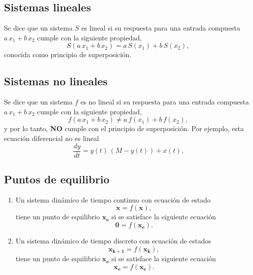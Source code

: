 \subsection{Sistemas lineales}

Se dice que un sistema $S$ es lineal si su respuesta para una entrada
compuesta $a \, x_{1}+b \, x_{2}$ cumple con la siguiente propiedad,
\begin{equation}
  S\left( a \, x_{1}+ b\, x_{2}\right) =a \, S\left( x_{1}\right) +b \, S\left( x_{2}\right),
\end{equation}
conocida como principio de superposici\'{o}n.

\subsection{Sistemas no lineales}

Se dice que un sistema $f$ es no lineal si su respuesta para una
entrada compuesta $a \, x_{1}+b \, x_{2}$ cumple con la siguiente propiedad,
\begin{equation}
  f\left( a \, x_{1}+b \, x_{2}\right) \neq a \, f\left( x_{1}\right) +b \, f\left( x_{2}\right) ,
\end{equation}
y por lo tanto, \textbf{NO} cumple con el principio de superposici\'{o}n.
Por ejemplo, esta ecuación diferencial no es lineal
\begin{equation}
 \frac{dy}{dt} = y(t) \, (M - y(t)) + x(t).
\end{equation}

\subsection{Puntos de equilibrio}

\begin{enumerate}

\item Un sistema din\'{a}mico de tiempo continuo con ecuación de estado
  \begin{equation}
    \mathbf{\dot x} = f(\mathbf{x}), 
  \end{equation}
tiene un punto de equilibrio $\mathbf{x_{e}}$ si se satisface la siguiente
  ecuaci\'{o}n
  \begin{equation}
    \mathbf{0} = f(\mathbf{x_{e}}).
  \end{equation}
        
\item Un sistema din\'{a}mico de tiempo discreto con ecuaci\'{o}n de estados
  \begin{equation}
    \mathbf{x_{k+1}} = f(\mathbf{x_{k}}), 
  \end{equation}
  tiene un punto de
  equilibrio $\mathbf{x_{e}}$ si se satisface la siguiente
  ecuaci\'{o}n
  \begin{equation}
    \mathbf{x_{e}} = f(\mathbf{x_{e}}).
  \end{equation}

\end{enumerate}
                
